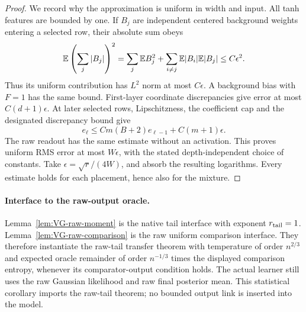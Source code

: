 \begin{proof}
We record why the approximation is uniform in width and input. All tanh features are bounded by one. If $B_j$ are independent centered background weights entering a selected row, their absolute sum obeys
\[
 \mathbb E\left(\sum_j|B_j|\right)^2
 =\sum_j\mathbb E B_j^2+\sum_{i\ne j}\mathbb E|B_i|\mathbb E|B_j|
 \le C\epsilon^2.
\]
Thus its uniform contribution has $L^2$ norm at most $C\epsilon$. A background bias with $F=1$ has the same bound. First-layer coordinate discrepancies give error at most $C(d+1)\epsilon$. At later selected rows, Lipschitzness, the coefficient cap and the designated discrepancy bound give
\[
 e_\ell\le Cm(B+2)e_{\ell-1}+C(m+1)\epsilon.
\]
The raw readout has the same estimate without an activation. This proves uniform RMS error at most $W\epsilon$, with the stated depth-independent choice of constants. Take
$\epsilon=\sqrt r/(4W)$, and absorb the resulting logarithms. Every estimate holds for each placement, hence also for the mixture.
\end{proof}

\paragraph{Interface to the raw-output oracle.}
Lemma~\ref{lem:VG-raw-moment} is the native tail interface with exponent $r_{\rm tail}=1$. Lemma~\ref{lem:VG-raw-comparison} is the raw uniform comparison interface. They therefore instantiate the raw-tail transfer theorem with temperature of order $n^{2/3}$ and expected oracle remainder of order $n^{-1/3}$ times the displayed comparison entropy, whenever its comparator-output condition holds. The actual learner still uses the raw Gaussian likelihood and raw final posterior mean. This statistical corollary imports the raw-tail theorem; no bounded output link is inserted into the model.

